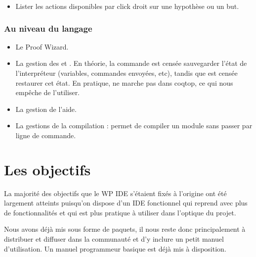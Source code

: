 \begin{itemize}
    \item Lister les actions disponibles par click droit sur une hypothèse ou un but.
\end{itemize}

\subsubsection{Au niveau du langage}

\begin{itemize}
    \item Le Proof Wizard.
    \item La gestion des  et . En théorie, la commande  est censée sauvegarder l'état de l'interpréteur (variables, commandes envoyées, etc), tandis que  est censée restaurer cet état.
En pratique,  ne marche pas dans coqtop, ce qui nous empêche de l'utiliser.
    \item La gestion de l'aide.
    \item La gestions de la compilation : \CoqIde{} permet de compiler un module sans passer par ligne de commande.
\end{itemize}

\section{Les objectifs}

La majorité des objectifs que le WP IDE s'étaient fixés à l'origine ont été largement atteints puisqu'on dispose d'un IDE fonctionnel qui reprend \CoqIde{} avec plus de fonctionnalités et qui est plus pratique à utiliser dans l'optique du projet.

Nous avons déjà mis \coquille{} sous forme de paquets, il nous reste donc principalement à distribuer et diffuser \coquille{} dans la communauté \Coq{} et d'y inclure un petit manuel d'utilisation. Un manuel programmeur basique est déjà mis à disposition.



